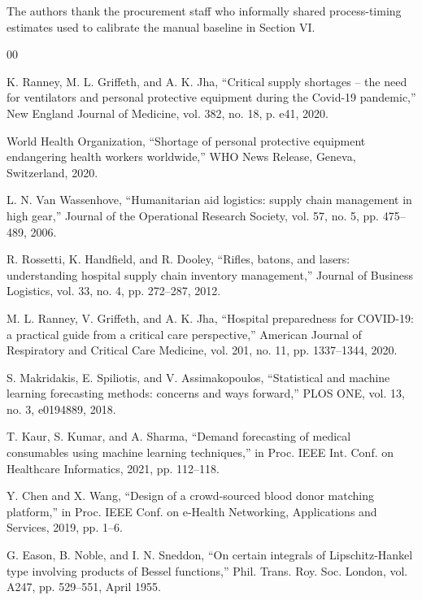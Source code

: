 \documentclass[conference]{IEEEtran}
\begin{document}
The authors thank the procurement staff who informally shared process-timing estimates used to calibrate the manual baseline in Section VI.


\begin{thebibliography}{00}

K. Ranney, M. L. Griffeth, and A. K. Jha,
``Critical supply shortages -- the need for ventilators and personal protective equipment during the Covid-19 pandemic,''
New England Journal of Medicine, vol. 382, no. 18, p. e41, 2020.

World Health Organization,
``Shortage of personal protective equipment endangering health workers worldwide,''
WHO News Release, Geneva, Switzerland, 2020.

L. N. Van Wassenhove,
``Humanitarian aid logistics: supply chain management in high gear,''
Journal of the Operational Research Society, vol. 57, no. 5, pp. 475--489, 2006.

R. Rossetti, K. Handfield, and R. Dooley,
``Rifles, batons, and lasers: understanding hospital supply chain inventory management,''
Journal of Business Logistics, vol. 33, no. 4, pp. 272--287, 2012.

M. L. Ranney, V. Griffeth, and A. K. Jha,
``Hospital preparedness for COVID-19: a practical guide from a critical care perspective,''
American Journal of Respiratory and Critical Care Medicine, vol. 201, no. 11, pp. 1337--1344, 2020.

S. Makridakis, E. Spiliotis, and V. Assimakopoulos,
``Statistical and machine learning forecasting methods: concerns and ways forward,''
PLOS ONE, vol. 13, no. 3, e0194889, 2018.

T. Kaur, S. Kumar, and A. Sharma,
``Demand forecasting of medical consumables using machine learning techniques,''
in Proc. IEEE Int. Conf. on Healthcare Informatics, 2021, pp. 112--118.

Y. Chen and X. Wang,
``Design of a crowd-sourced blood donor matching platform,''
in Proc. IEEE Conf. on e-Health Networking, Applications and Services, 2019, pp. 1--6.

G. Eason, B. Noble, and I. N. Sneddon,
``On certain integrals of Lipschitz-Hankel type involving products of Bessel functions,''
Phil. Trans. Roy. Soc. London, vol. A247, pp. 529--551, April 1955.


\end{thebibliography}
\end{document}
